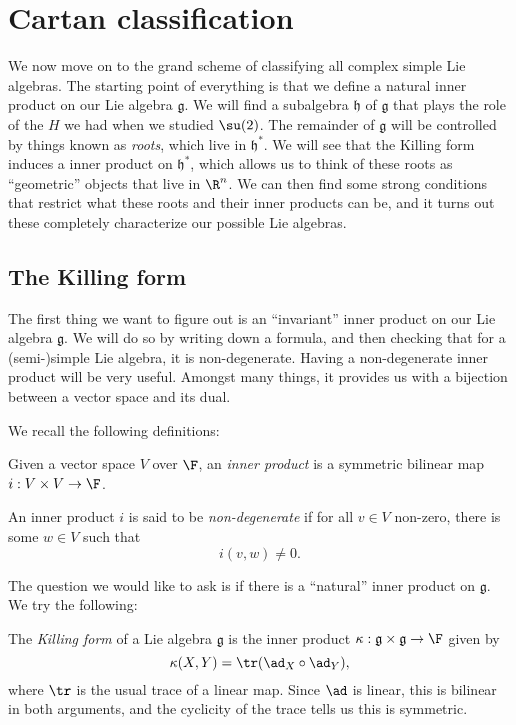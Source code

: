 \documentclass[a4paper]{article}
\begin{document}
\section{Cartan classification}
We now move on to the grand scheme of classifying all complex simple Lie algebras. The starting point of everything is that we define a natural inner product on our Lie algebra $\mathfrak{g}$. We will find a subalgebra $\mathfrak{h}$ of $\mathfrak{g}$ that plays the role of the $H$ we had when we studied $\su(2)$. The remainder of $\mathfrak{g}$ will be controlled by things known as \emph{roots}, which live in $\mathfrak{h}^*$. We will see that the Killing form induces a inner product on $\mathfrak{h}^*$, which allows us to think of these roots as ``geometric'' objects that live in $\R^n$. We can then find some strong conditions that restrict what these roots and their inner products can be, and it turns out these completely characterize our possible Lie algebras.

\subsection{The Killing form}
The first thing we want to figure out is an ``invariant'' inner product on our Lie algebra $\mathfrak{g}$. We will do so by writing down a formula, and then checking that for a (semi-)simple Lie algebra, it is non-degenerate. Having a non-degenerate inner product will be very useful. Amongst many things, it provides us with a bijection between a vector space and its dual.

We recall the following definitions:
\begin{defi}
  Given a vector space $V$ over $\F$, an \emph{inner product} is a symmetric bilinear map $i: V \times V \to \F$.
\end{defi}

\begin{defi}
  An inner product $i$ is said to be \emph{non-degenerate} if for all $v \in V$ non-zero, there is some $w \in V$ such that
  \[
    i(v, w) \not= 0.
  \]
\end{defi}

The question we would like to ask is if there is a ``natural'' inner product on $\mathfrak{g}$. We try the following:

\begin{defi}
  The \emph{Killing form} of a Lie algebra $\mathfrak{g}$ is the inner product $\kappa: \mathfrak{g} \times \mathfrak{g} \to \F$ given by
  \[
    \kappa(X, Y) = \tr(\ad_X \circ \ad_Y),
  \]
  where $\tr$ is the usual trace of a linear map. Since $\ad$ is linear, this is bilinear in both arguments, and the cyclicity of the trace tells us this is symmetric.
\end{defi}
\end{document}
